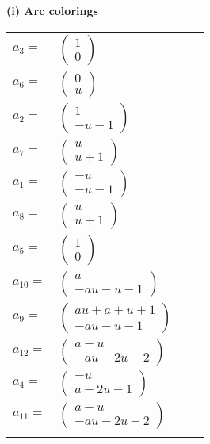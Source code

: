 \documentclass[1p]{elsarticle_modified}
\theoremstyle{definition}
\begin{document}
\flushleft \textbf{(i) Arc colorings}\\
\begin{tabular}{m{7pt} m{180pt} m{7pt} m{180pt} }
\flushright $a_{3}=$&$\begin{pmatrix}1\\0\end{pmatrix}$ \\
\flushright $a_{6}=$&$\begin{pmatrix}0\\u\end{pmatrix}$ \\
\flushright $a_{2}=$&$\begin{pmatrix}1\\- u-1\end{pmatrix}$ \\
\flushright $a_{7}=$&$\begin{pmatrix}u\\u+1\end{pmatrix}$ \\
\flushright $a_{1}=$&$\begin{pmatrix}- u\\- u-1\end{pmatrix}$ \\
\flushright $a_{8}=$&$\begin{pmatrix}u\\u+1\end{pmatrix}$ \\
\flushright $a_{5}=$&$\begin{pmatrix}1\\0\end{pmatrix}$ \\
\flushright $a_{10}=$&$\begin{pmatrix}a\\- a u- u-1\end{pmatrix}$ \\
\flushright $a_{9}=$&$\begin{pmatrix}a u+a+u+1\\- a u- u-1\end{pmatrix}$ \\
\flushright $a_{12}=$&$\begin{pmatrix}a- u\\- a u-2 u-2\end{pmatrix}$ \\
\flushright $a_{4}=$&$\begin{pmatrix}- u\\a-2 u-1\end{pmatrix}$ \\
\flushright $a_{11}=$&$\begin{pmatrix}a- u\\- a u-2 u-2\end{pmatrix}$\\&\end{tabular}
\end{document}
